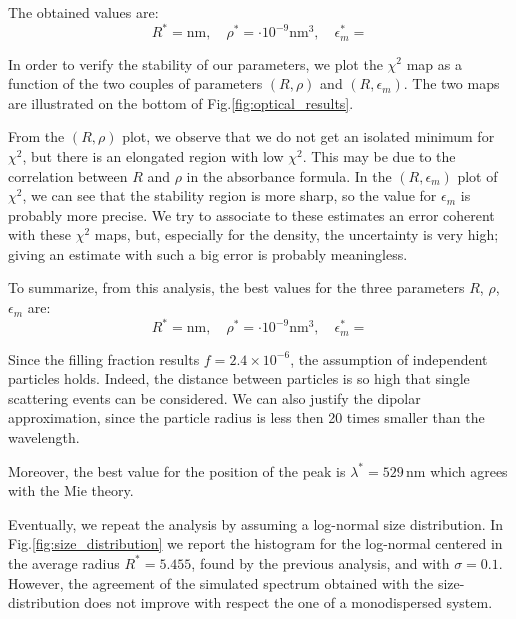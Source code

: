 \documentclass[twocolumn]{article}
\begin{document}
\begin{multicols}{2}
The obtained values are:
\begin{equation*}
    R^* =   \text{nm}, \quad \rho^* = \cdot 10^{-9} \text{nm}^3 , \quad \epsilon_m^* =
\end{equation*}

In order to verify the stability of our parameters, we plot the $\chi^2$ map as a function of the two couples of parameters \( (R,\rho) \) and \( (R,\epsilon_m) \). The two maps are illustrated on the bottom of Fig.\ref{fig:optical_results}.

From the \( (R,\rho) \) plot, we observe that we do not get an isolated minimum for $\chi^2$, but there is an elongated region with low $\chi^2$. This may be due to the correlation between $R$ and $\rho$ in the absorbance formula. In the \( (R,\epsilon_m) \) plot of $\chi^2$, we can see that the stability region is more sharp, so the value for $\epsilon_m$ is probably more precise. We try to associate to these estimates an error coherent with these $\chi^2$ maps, but, especially for the density, the uncertainty is very high; giving an estimate with such a big error is probably meaningless.

To summarize, from this analysis, the best values for the three parameters $R$, $\rho$, $\epsilon_m$ are:
\begin{equation*}
    R^* = \text{nm}, \quad \rho^* = \cdot 10^{-9} \text{nm}^3 , \quad \epsilon_m^* =
\end{equation*}

Since the filling fraction results $f=2.4 \times 10^{-6}$, the assumption of independent particles holds. Indeed, the distance between particles is so high that single scattering events can be considered. We can also justify the dipolar approximation, since the particle radius is less then 20 times smaller than the wavelength.

Moreover, the best value for the position of the peak is $\lambda^* = 529\, \text{nm}$ which agrees with the Mie theory. 

Eventually, we repeat the analysis by assuming a log-normal size distribution. In Fig.\ref{fig:size_distribution} we report the histogram for the log-normal centered in the average radius $R^*=5.455$, found by the previous analysis, and with $\sigma=0.1$. However, the agreement of the simulated spectrum obtained with the size-distribution does not improve with respect the one of a monodispersed system.

\end{multicols}
\end{document}
